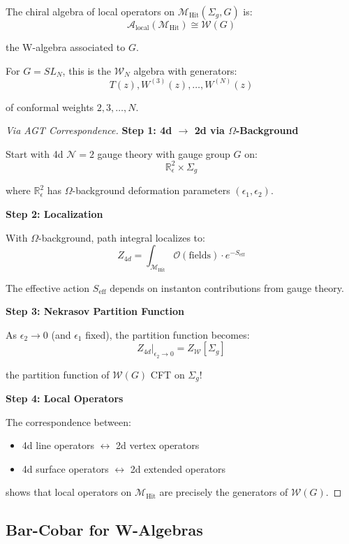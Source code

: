 \begin{theorem}
The chiral algebra of local operators on $\mathcal{M}_{\text{Hit}}(\Sigma_g, G)$ is:
$$\mathcal{A}_{\text{local}}(\mathcal{M}_{\text{Hit}}) \cong \mathcal{W}(G)$$

the W-algebra associated to $G$.

For $G = SL_N$, this is the $\mathcal{W}_N$ algebra with generators:
$$T(z), W^{(3)}(z), \ldots, W^{(N)}(z)$$

of conformal weights $2, 3, \ldots, N$.
\end{theorem}

\begin{proof}[Via AGT Correspondence]
\textbf{Step 1: 4d $\to$ 2d via $\Omega$-Background}

Start with 4d $\mathcal{N}=2$ gauge theory with gauge group $G$ on:
$$\mathbb{R}^2_\epsilon \times \Sigma_g$$

where $\mathbb{R}^2_\epsilon$ has $\Omega$-background deformation parameters 
$(\epsilon_1, \epsilon_2)$.

\textbf{Step 2: Localization}

With $\Omega$-background, path integral localizes to:
$$Z_{4d} = \int_{\mathcal{M}_{\text{Hit}}} \mathcal{O}(\text{fields}) \cdot 
e^{-S_{\text{eff}}}$$

The effective action $S_{\text{eff}}$ depends on instanton contributions from 
gauge theory.

\textbf{Step 3: Nekrasov Partition Function}

As $\epsilon_2 \to 0$ (and $\epsilon_1$ fixed), the partition function becomes:
$$Z_{4d}|_{\epsilon_2 \to 0} = Z_{\mathcal{W}}[\Sigma_g]$$

the partition function of $\mathcal{W}(G)$ CFT on $\Sigma_g$!

\textbf{Step 4: Local Operators}

The correspondence between:
\begin{itemize}
\item 4d line operators $\leftrightarrow$ 2d vertex operators
\item 4d surface operators $\leftrightarrow$ 2d extended operators
\end{itemize}

shows that local operators on $\mathcal{M}_{\text{Hit}}$ are precisely the 
generators of $\mathcal{W}(G)$.
\end{proof}

\subsection{Bar-Cobar for W-Algebras}

